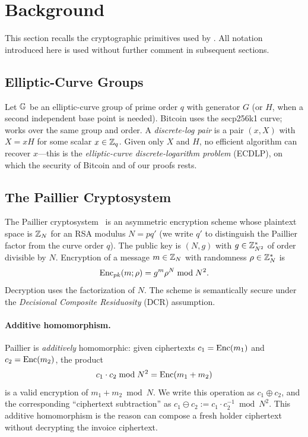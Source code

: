\section{Background}\label{sec:background}

This section recalls the cryptographic primitives used by \thunderbolt. All notation introduced here is used without further comment in subsequent sections.

\subsection{Elliptic-Curve Groups}\label{sec:bg-ec}

Let $\mathbb{G}$ be an elliptic-curve group of prime order $q$ with generator $G$ (or $H$, when a second independent base point is needed). Bitcoin uses the secp256k1 curve; \thunderbolt works over the same group and order. A \emph{discrete-log pair} is a pair $(x, X)$ with $X = xH$ for some scalar $x \in \mathbb{Z}_q$. Given only $X$ and $H$, no efficient algorithm can recover $x$---this is the \emph{elliptic-curve discrete-logarithm problem} (ECDLP), on which the security of Bitcoin and of our proofs rests.

\subsection{The Paillier Cryptosystem}\label{sec:bg-paillier}

The Paillier cryptosystem~\cite{paillier1999public} is an asymmetric encryption scheme whose plaintext space is $\mathbb{Z}_N$ for an RSA modulus $N = pq'$ (we write $q'$ to distinguish the Paillier factor from the curve order $q$). The public key is $(N, g)$ with $g \in \mathbb{Z}_{N^2}^*$ of order divisible by $N$. Encryption of a message $m \in \mathbb{Z}_N$ with randomness $\rho \in \mathbb{Z}_N^*$ is
$$
\mathrm{Enc}_{pk}(m;\rho) = g^m \rho^N \bmod N^2.
$$
Decryption uses the factorization of $N$. The scheme is semantically secure under the \emph{Decisional Composite Residuosity} (DCR) assumption.

\paragraph{Additive homomorphism.} Paillier is \emph{additively} homomorphic: given ciphertexts $c_1 = \mathrm{Enc}(m_1)$ and $c_2 = \mathrm{Enc}(m_2)$, the product
$$
c_1 \cdot c_2 \bmod N^2 = \mathrm{Enc}(m_1 + m_2)
$$
is a valid encryption of $m_1 + m_2 \bmod N$. We write this operation as $c_1 \oplus c_2$, and the corresponding ``ciphertext subtraction'' as $c_1 \ominus c_2 := c_1 \cdot c_2^{-1} \bmod N^2$. This additive homomorphism is the reason \thunderbolt can compose a fresh holder ciphertext without decrypting the invoice ciphertext.

